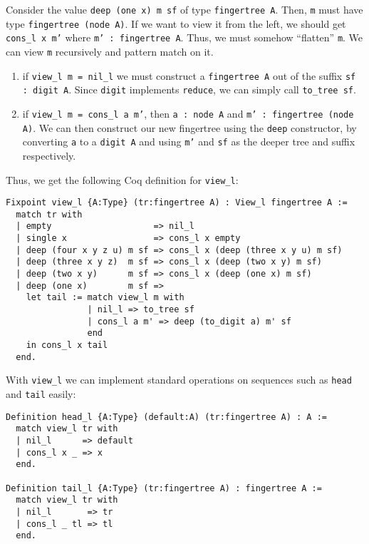 \documentclass{article}
\newcommand{\code}[1]{\texttt{#1}}
\begin{document}
Consider the value \code{deep (one x) m sf} of type \code{fingertree A}. Then,
\code{m} must have type \code{fingertree (node A)}.
If we want to view it from the left, we should get \code{cons\_l x m'} where
\code{m' : fingertree A}. Thus, we must somehow ``flatten'' \code{m}.
We can view \code{m} recursively and pattern match on it.
\begin{enumerate}
  \item if \code{view\_l m = nil\_l} we must construct a \code{fingertree A} out
        of the suffix \code{sf : digit A}. Since \code{digit} implements \code{reduce},
        we can simply call \code{to\_tree sf}.
  \item if \code{view\_l m = cons\_l a m'}, then \code{a : node A} and
        \code{m' : fingertree (node A)}. We can then construct our new fingertree
        using the \code{deep} constructor,
        by converting \code{a} to a \code{digit A} and using \code{m'} and \code{sf}
        as the deeper tree and suffix respectively.
\end{enumerate}

Thus, we get the following Coq definition for \code{view\_l}:

\begin{listing}[H]
\begin{verbatim}
Fixpoint view_l {A:Type} (tr:fingertree A) : View_l fingertree A :=
  match tr with
  | empty                    => nil_l
  | single x                 => cons_l x empty
  | deep (four x y z u) m sf => cons_l x (deep (three x y u) m sf)
  | deep (three x y z)  m sf => cons_l x (deep (two x y) m sf)
  | deep (two x y)      m sf => cons_l x (deep (one x) m sf)
  | deep (one x)        m sf =>
    let tail := match view_l m with
                | nil_l => to_tree sf
                | cons_l a m' => deep (to_digit a) m' sf
                end
    in cons_l x tail
  end.
\end{verbatim}
\end{listing}

With \code{view\_l} we can implement standard operations on sequences such
as \code{head} and \code{tail} easily:

\begin{verbatim}
Definition head_l {A:Type} (default:A) (tr:fingertree A) : A :=
  match view_l tr with
  | nil_l      => default
  | cons_l x _ => x
  end.

Definition tail_l {A:Type} (tr:fingertree A) : fingertree A :=
  match view_l tr with
  | nil_l       => tr
  | cons_l _ tl => tl
  end.
\end{verbatim}
\end{document}
